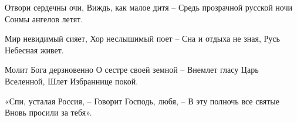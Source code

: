  
 

Отвори сердечны очи,
Виждь, как малое дитя –
Средь прозрачной русской ночи
Сонмы ангелов летят.

Мир невидимый сияет,
Хор неслышимый поет –
Сна и отдыха не зная,
Русь Небесная живет.

Молит Бога дерзновенно
О сестре своей земной –
Внемлет гласу Царь Вселенной,
Шлет Избраннице покой.

«Спи, усталая Россия, –
Говорит Господь, любя, –
В эту полночь все святые
Вновь просили за тебя».
